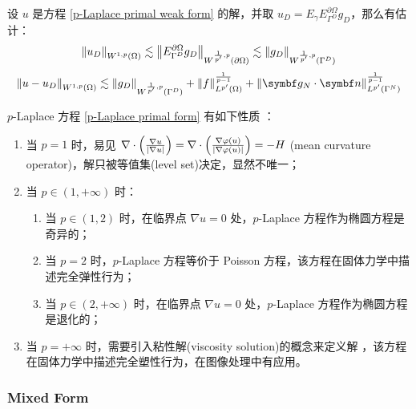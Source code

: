 
\begin{theorem}\label{p-Laplace energy estimate}
	设 \(u\) 是方程 \eqref{p-Laplace primal weak form} 的解，并取 \(u_{D} = E_{\gamma} E_{\Gamma^{D}}^{\partial\Omega} g_{D}\)，那么有估计：
	\begin{equation}
		\left\lVert u_{D}\right\rVert_{W^{1,p}(\Omega)} 
		\lesssim \left\lVert E_{\Gamma^{D}}^{\partial\Omega} g_{D}\right\rVert_{W^{\frac{1}{p'}, p}(\partial\Omega)} 
		\lesssim \left\lVert g_{D}\right\rVert_{W^{\frac{1}{p'}, p}(\Gamma^{D})}
	\end{equation}
	\begin{equation}
		\norm{u - u_{D}}_{W^{1,p}(\Omega)} 
		\lesssim \norm{g_{D}}_{W^{\frac{1}{p'}, p}(\Gamma^{D})} + \norm{f}_{L^{p'}(\Omega)}^{\frac{1}{p-1}} + \norm{\bm g_{N} \cdot \bm n}_{L^{p'}(\Gamma^{N})}^{\frac{1}{p-1}} 
	\end{equation}
\end{theorem}


\(p\)-Laplace 方程 \eqref{p-Laplace primal form} 有如下性质 \cite{lindqvist2017notes}：
\begin{enumerate}
	\item 当 \(p = 1\) 时，易见 \(\nabla\cdot\left(\frac{\nabla u}{\left\lvert\nabla u\right\rvert}\right) = \nabla\cdot\left(\frac{\nabla\varphi(u)}{\left\lvert\nabla\varphi(u)\right\rvert}\right) = -H\) (mean curvature operator)，解只被等值集(level set)决定，显然不唯一；
	\item 当 \(p \in (1, +\infty)\) 时：\begin{enumerate}
		\item 当 \(p \in (1,2)\) 时，在临界点 \(\nabla u = 0\) 处，\(p\)-Laplace 方程作为椭圆方程是奇异的；
		\item 当 \(p = 2\) 时，\(p\)-Laplace 方程等价于 Poisson 方程，该方程在固体力学中描述完全弹性行为；
		\item 当 \(p \in (2, +\infty)\) 时，在临界点 \(\nabla u = 0\) 处，\(p\)-Laplace 方程作为椭圆方程是退化的；
	\end{enumerate}
	\item 当 \(p = +\infty\) 时，需要引入粘性解(viscosity solution)的概念来定义解 \cite{10.1007/978-3-319-31532-4_4}，该方程在固体力学中描述完全塑性行为，在图像处理中有应用。
\end{enumerate}


\subsubsection{Mixed Form}

